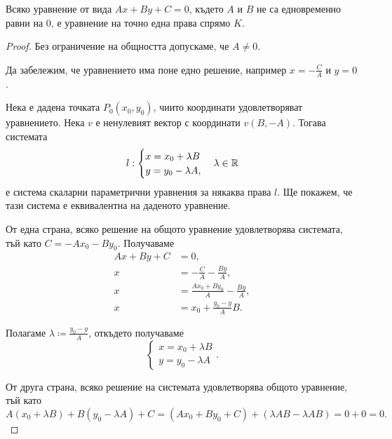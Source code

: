 \documentclass[numbers=endperiod, DIV=15]{scrartcl}
\begin{document}
\begin{proposition}
  Всяко уравнение от вида $Ax + By + C = 0$, където $A$ и $B$ не са едновременно равни на $0$, е уравнение на точно една права спрямо $K$.
\end{proposition}
\begin{proof}
  Без ограничение на общността допускаме, че $A \neq 0$.

  Да забележим, че уравнението има поне едно решение, например $x = -\frac C A$ и $y = 0$.

  Нека е дадена точката $P_0(x_0, y_0)$, чиито координати удовлетворяват уравнението. Нека $v$ е ненулевият вектор с координати $v(B, -A)$. Тогава системата
  \begin{align*}
    l: \begin{cases}
      x = x_0 + \lambda B \\
      y = y_0 - \lambda A,
    \end{cases}
    \lambda \in \mathbb{R}
  \end{align*}
  е система скаларни параметрични уравнения за някаква права $l$. Ще покажем, че тази система е еквивалентна на даденото уравнение.

  От една страна, всяко решение на общото уравнение удовлетворява системата, тъй като $C = -Ax_0 - By_0$. Получаваме
  \begin{align*}
    Ax + By + C &= 0, \\
    x &= -\frac C A -\frac {By} A, \\
    x &= \frac {Ax_0 + By_0} A -\frac {By} A, \\
    x &= x_0 + \frac {y_0 - y} A B.
  \end{align*}

  Полагаме $\lambda \coloneqq \frac{y_0 - y} A$, откъдето получаваме
  \begin{displaymath}
    \begin{cases}
      x = x_0 + \lambda B \\
      y = y_0 - \lambda A
    \end{cases}.
  \end{displaymath}

  От друга страна, всяко решение на системата удовлетворява общото уравнение, тъй като
  \begin{displaymath}
    A (x_0 + \lambda B) + B (y_0 - \lambda A) + C
    =
    (A x_0 + B y_0 + C) + (\lambda AB - \lambda AB)
    =
    0 + 0 = 0.
  \end{displaymath}
\end{proof}
\end{document}
